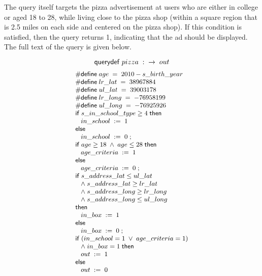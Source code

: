 The query itself targets the pizza advertisement at users who are
either in college or aged 18 to 28, while living close to the pizza
shop (within a square region that is 2.5 miles on each side and
centered on the pizza shop).  If this condition is satisfied, then the
query returns 1, indicating that the ad should be displayed.  The full
text of the query is given below.

$$ \squerydefk \; pizza \; : \; \; \ra \; out$$
\begin{displaymath}{\small
\begin{array}{l}
  \psdefine{age}{\ebinop{-}{2010}{s\text{\_}birth\text{\_}year}}\\
  \psdefine{lr\text{\_}lat}{38967884}\\
  \psdefine{ul\text{\_}lat}{39003178}\\
  \psdefine{lr\text{\_}long}{-76958199}\\
  \psdefine{ul\text{\_}long}{-76925926}\\
  \sifk \; \lreln{\geq}{s\text{\_}in\text{\_}school\text{\_}type}{4} \; \sthenk\\
  \;\;\;\sassign{in\text{\_}school}{1}\\
  \selsek\\
  \;\;\;\sassign{in\text{\_}school}{0}\; ;\\
  \sifk \; \lbinop{\wedge}{\lreln{\geq}{age}{18}}{\lreln{\leq}{age}{28}} \; \sthenk\\
  \;\;\;\sassign{age\text{\_}criteria}{1}\\
  \selsek\\
  \;\;\;\sassign{age\text{\_}criteria}{0}\; ;\\
  \sifk \; \lbinop{\wedge}{\lbinop{\wedge}{\lbinop{\wedge}{\lreln{\leq}{s\text{\_}address\text{\_}lat}{ul\text{\_}lat}\\\;\;}{\lreln{\geq}{s\text{\_}address\text{\_}lat}{lr\text{\_}lat}\\\;\;}}{\lreln{\geq}{s\text{\_}address\text{\_}long}{lr\text{\_}long}\\\;\;}}{\lreln{\leq}{s\text{\_}address\text{\_}long}{ul\text{\_}long}}\\\sthenk\\
  \;\;\;\sassign{in\text{\_}box}{1}\\
  \selsek\\
  \;\;\;\sassign{in\text{\_}box}{0}\; ;\\
  \sifk \; \lbinop{\wedge}{\lbinop{\vee}{(\lreln{=}{in\text{\_}school}{1}}{\lreln{=}{age\text{\_}criteria}{1}})\\\;\;}{\lreln{=}{in\text{\_}box}{1}} \; \sthenk\\
  \;\;\;\sassign{out}{1}\\
  \selsek\\
  \;\;\;\sassign{out}{0}\\
\end{array}
}
\end{displaymath}

